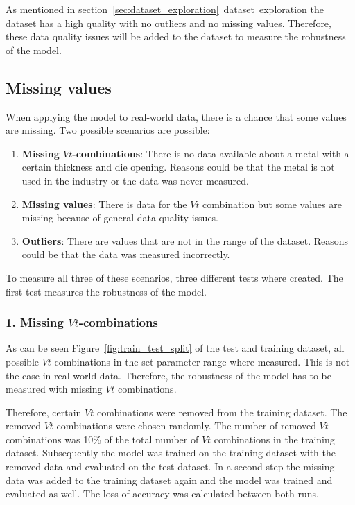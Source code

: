 As mentioned in section~\ref{sec:dataset_exploration}~dataset~exploration the dataset has a high quality with no outliers and no missing values.
Therefore, these data quality issues will be added to the dataset to measure the robustness of the model.

\subsection{Missing values}
When applying the model to real-world data, there is a chance that some values are missing. Two possible scenarios are possible:

\begin{enumerate}
    \item \textbf{Missing $Vt$-combinations}: There is no data available about a metal with a certain thickness and die opening. Reasons could be that the metal is not used in the industry or the data was never measured.
    \item \textbf{Missing values}: There is data for the $Vt$ combination but some values are missing because of general data quality issues.
    \item \textbf{Outliers}: There are values that are not in the range of the dataset. Reasons could be that the data was measured incorrectly.
\end{enumerate}

To measure all three of these scenarios, three different tests where created. The first test measures the robustness of the model.

\subsubsection*{1. Missing $Vt$-combinations}
As can be seen Figure~\ref{fig:train_test_split} of the test and training dataset, all possible $Vt$ combinations in the set parameter range where measured.
This is not the case in real-world data. Therefore, the robustness of the model has to be measured with missing $Vt$ combinations.

Therefore, certain $Vt$ combinations were removed from the training dataset. The removed $Vt$ combinations were chosen randomly. The number of removed $Vt$ combinations was 10\% of the total number of $Vt$ combinations in the training dataset.
Subsequently the model was trained on the training dataset with the removed data and evaluated on the test dataset.
In a second step the missing data was added to the training dataset again and the model was trained and evaluated as well.
The loss of accuracy was calculated between both runs.

